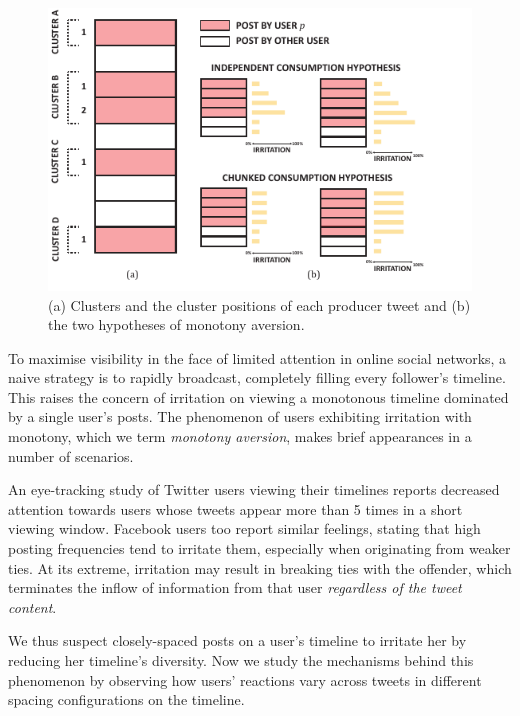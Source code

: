 \documentclass[onesided,asymmetric]{tufte-book}
\begin{document}
\begin{figure}
  \includegraphics[width=\linewidth]{monotony.pdf}
  \caption[Notation and hypotheses of monotony aversion.]{(a) Clusters and the cluster positions of each producer tweet and (b) the two hypotheses of monotony aversion.}
  \label{fig:monotony}
\end{figure}

To maximise visibility in the face of limited attention in online social networks, a naive strategy is to rapidly broadcast, completely filling every follower's timeline. This raises the concern of irritation on viewing a monotonous timeline dominated by a single user's posts. The phenomenon of users exhibiting irritation with monotony, which we term \textit{monotony aversion}, makes brief appearances in a number of scenarios.

An eye-tracking study of Twitter users viewing their timelines\cite{counts2011taking} reports decreased attention towards users whose tweets appear more than 5 times in a short viewing window. Facebook users too report similar feelings\cite{koroleva2011cognition}, stating that high posting frequencies tend to irritate them, especially when originating from weaker ties. At its extreme, irritation may result in breaking ties with the offender, which terminates the inflow of information from that user \textit{regardless of the tweet content}\cite{kwak2011fragile}.

We thus suspect closely-spaced posts on a user's timeline to irritate her by reducing her timeline's diversity. Now we study the mechanisms behind this phenomenon by observing how users' reactions vary across tweets in different spacing configurations on the timeline.
\end{document}
